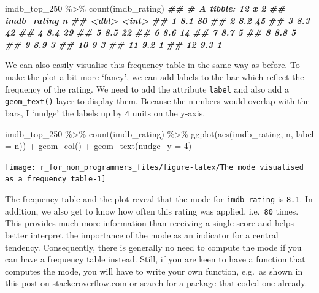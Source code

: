 \documentclass[
]{book}
\newenvironment{Shaded}{\begin{snugshade}}{\end{snugshade}}
\newcommand{\AttributeTok}[1]{\textcolor[rgb]{0.77,0.63,0.00}{#1}}
\newcommand{\DecValTok}[1]{\textcolor[rgb]{0.00,0.00,0.81}{#1}}
\newcommand{\DocumentationTok}[1]{\textcolor[rgb]{0.56,0.35,0.01}{\textbf{\textit{#1}}}}
\newcommand{\FunctionTok}[1]{\textcolor[rgb]{0.00,0.00,0.00}{#1}}
\newcommand{\NormalTok}[1]{#1}
\newcommand{\SpecialCharTok}[1]{\textcolor[rgb]{0.00,0.00,0.00}{#1}}
\begin{document}
\begin{Shaded}
\begin{Highlighting}[]
\NormalTok{imdb\_top\_250 }\SpecialCharTok{\%\textgreater{}\%} \FunctionTok{count}\NormalTok{(imdb\_rating)}
\DocumentationTok{\#\# \# A tibble: 12 x 2}
\DocumentationTok{\#\#    imdb\_rating     n}
\DocumentationTok{\#\#          \textless{}dbl\textgreater{} \textless{}int\textgreater{}}
\DocumentationTok{\#\#  1         8.1    80}
\DocumentationTok{\#\#  2         8.2    45}
\DocumentationTok{\#\#  3         8.3    42}
\DocumentationTok{\#\#  4         8.4    29}
\DocumentationTok{\#\#  5         8.5    22}
\DocumentationTok{\#\#  6         8.6    14}
\DocumentationTok{\#\#  7         8.7     5}
\DocumentationTok{\#\#  8         8.8     5}
\DocumentationTok{\#\#  9         8.9     3}
\DocumentationTok{\#\# 10         9       3}
\DocumentationTok{\#\# 11         9.2     1}
\DocumentationTok{\#\# 12         9.3     1}
\end{Highlighting}
\end{Shaded}

We can also easily visualise this frequency table in the same way as before. To make the plot a bit more `fancy', we can add labels to the bar which reflect the frequency of the rating. We need to add the attribute \texttt{label} and also add a \texttt{geom\_text()} layer to display them. Because the numbers would overlap with the bars, I `nudge' the labels up by \texttt{4} units on the y-axis.

\begin{Shaded}
\begin{Highlighting}[]
\NormalTok{imdb\_top\_250 }\SpecialCharTok{\%\textgreater{}\%} 
  \FunctionTok{count}\NormalTok{(imdb\_rating) }\SpecialCharTok{\%\textgreater{}\%} 
  \FunctionTok{ggplot}\NormalTok{(}\FunctionTok{aes}\NormalTok{(imdb\_rating, n, }\AttributeTok{label =}\NormalTok{ n)) }\SpecialCharTok{+}
  \FunctionTok{geom\_col}\NormalTok{() }\SpecialCharTok{+}
  \FunctionTok{geom\_text}\NormalTok{(}\AttributeTok{nudge\_y =} \DecValTok{4}\NormalTok{)}
\end{Highlighting}
\end{Shaded}

\begin{center}\texttt{[image: r\_for\_non\_programmers\_files/figure-latex/The mode visualised as a frequency table-1]} \end{center}

The frequency table and the plot reveal that the mode for \texttt{imdb\_rating} is \texttt{8.1}. In addition, we also get to know how often this rating was applied, i.e.~\texttt{80} times. This provides much more information than receiving a single score and helps better interpret the importance of the mode as an indicator for a central tendency. Consequently, there is generally no need to compute the mode if you can have a frequency table instead. Still, if you are keen to have a function that computes the mode, you will have to write your own function, e.g.~as shown in this post on \href{https://stackoverflow.com/questions/2547402/how-to-find-the-statistical-mode}{stackeroverflow.com} or search for a package that coded one already.
\end{document}
